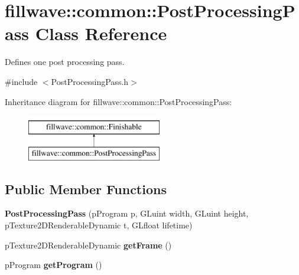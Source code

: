 \hypertarget{classfillwave_1_1common_1_1PostProcessingPass}{}\section{fillwave\+:\+:common\+:\+:Post\+Processing\+Pass Class Reference}
\label{classfillwave_1_1common_1_1PostProcessingPass}


Defines one post processing pass.  




{\ttfamily \#include $<$Post\+Processing\+Pass.\+h$>$}

Inheritance diagram for fillwave\+:\+:common\+:\+:Post\+Processing\+Pass\+:\begin{figure}[H]
\begin{center}
\leavevmode
\includegraphics[height=2.000000cm]{classfillwave_1_1common_1_1PostProcessingPass}
\end{center}
\end{figure}
\subsection*{Public Member Functions}
\begin{DoxyCompactItemize}
\item 
\hypertarget{classfillwave_1_1common_1_1PostProcessingPass_aab7dc2f05e3737a60c50adac50642055}{}{\bfseries Post\+Processing\+Pass} (p\+Program p, G\+Luint width, G\+Luint height, p\+Texture2\+D\+Renderable\+Dynamic t, G\+Lfloat lifetime)\label{classfillwave_1_1common_1_1PostProcessingPass_aab7dc2f05e3737a60c50adac50642055}

\item 
\hypertarget{classfillwave_1_1common_1_1PostProcessingPass_a9f6227f90429e127a52828bc4b924801}{}p\+Texture2\+D\+Renderable\+Dynamic {\bfseries get\+Frame} ()\label{classfillwave_1_1common_1_1PostProcessingPass_a9f6227f90429e127a52828bc4b924801}

\item 
\hypertarget{classfillwave_1_1common_1_1PostProcessingPass_a197ed5575412b449363a1426842c2840}{}p\+Program {\bfseries get\+Program} ()\label{classfillwave_1_1common_1_1PostProcessingPass_a197ed5575412b449363a1426842c2840}

\end{DoxyCompactItemize}
